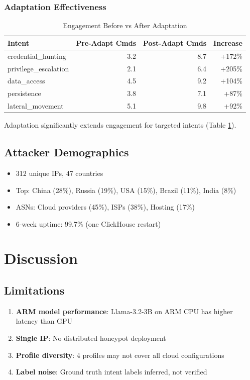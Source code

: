 \documentclass[10pt,conference]{IEEEtran}
\begin{document}
\subsubsection{Adaptation Effectiveness}
\begin{table}[htbp]
\centering
\caption{Engagement Before vs After Adaptation}
\label{tab:adapt_effect}
\begin{tabular}{@{}lrrr@{}}
\toprule
\textbf{Intent} & \textbf{Pre-Adapt Cmds} & \textbf{Post-Adapt Cmds} & \textbf{Increase} \\
\midrule
credential\_hunting & 3.2 & 8.7 & +172\% \\
privilege\_escalation & 2.1 & 6.4 & +205\% \\
data\_access & 4.5 & 9.2 & +104\% \\
persistence & 3.8 & 7.1 & +87\% \\
lateral\_movement & 5.1 & 9.8 & +92\% \\
\bottomrule
\end{tabular}
\end{table}

Adaptation significantly extends engagement for targeted intents (Table \ref{tab:adapt_effect}).

\subsection{Attacker Demographics}
\begin{itemize}
    \item 312 unique IPs, 47 countries
    \item Top: China (28\%), Russia (19\%), USA (15\%), Brazil (11\%), India (8\%)
    \item ASNs: Cloud providers (45\%), ISPs (38\%), Hosting (17\%)
    \item 6-week uptime: 99.7\% (one ClickHouse restart)
\end{itemize}

\section{Discussion}
\label{sec:discussion}

\subsection{Limitations}
\begin{enumerate}
    \item \textbf{ARM model performance}: Llama-3.2-3B on ARM CPU has higher latency than GPU
    \item \textbf{Single IP}: No distributed honeypot deployment
    \item \textbf{Profile diversity}: 4 profiles may not cover all cloud configurations
    \item \textbf{Label noise}: Ground truth intent labels inferred, not verified
\end{enumerate}
\end{document}
